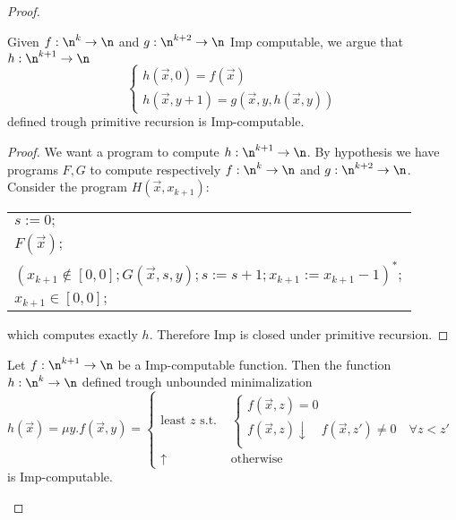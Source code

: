 \begin{proof}
  \begin{lemma}
    Given \(f : \n^k \to \n\) and \(g : \n^{k+2} \to \n\) Imp
    computable, we argue that \(h : \n^{k+1} \to \n\)
    \[\begin{cases}
    h(\vec{x}, 0) = f(\vec{x}) \\
    h(\vec{x}, y+1) = g(\vec{x}, y, h(\vec{x}, y))
    \end{cases}\]
    defined trough primitive recursion is Imp-computable.
  \end{lemma}
  \begin{proof}
    We want a program to compute \(h : \n^{k+1} \to \n\). By
    hypothesis we have programs \(F, G\) to compute respectively \(f:
    \n^k \to \n\) and \(g : \n^{k+2} \to \n\). Consider the program
    \(H(\vec{x},x_{k+1})\):
    \begin{center}
      \begin{tabular}{l}
        \(s := 0;\)\\[0pt]
        \(F(\vec{x});\)\\[0pt]
        \((x_{k+1} \not\in [0,0]; G(\vec{x},s,y);s:=s+1;x_{k+1}:=x_{k+1}-1)^*;\)\\[0pt]
        \(x_{k+1} \in [0,0];\)\\[0pt]
      \end{tabular}

    \end{center}

    which computes exactly \(h\). Therefore Imp is closed under
    primitive recursion.
  \end{proof}

  \begin{lemma}
    Let \(f : \n^{k+1} \to \n\) be a Imp-computable function. Then the
    function \(h : \n^k \to \n\) defined trough unbounded
    minimalization
    \begin{equation}
      h(\vec{x}) = \mu y . f(\vec{x}, y) = \begin{cases}
        \text{least } z \text{ s.t. } & \begin{cases}
          f(\vec{x}, z) = 0 \\
	  f(\vec{x}, z) \downarrow \quad f(\vec{x},z')\neq 0 \quad \forall z < z' \\
	\end{cases} \\
        \uparrow                      & \text{otherwise}
      \end{cases}
    \end{equation}
    is Imp-computable.
  \end{lemma}


\end{proof}
